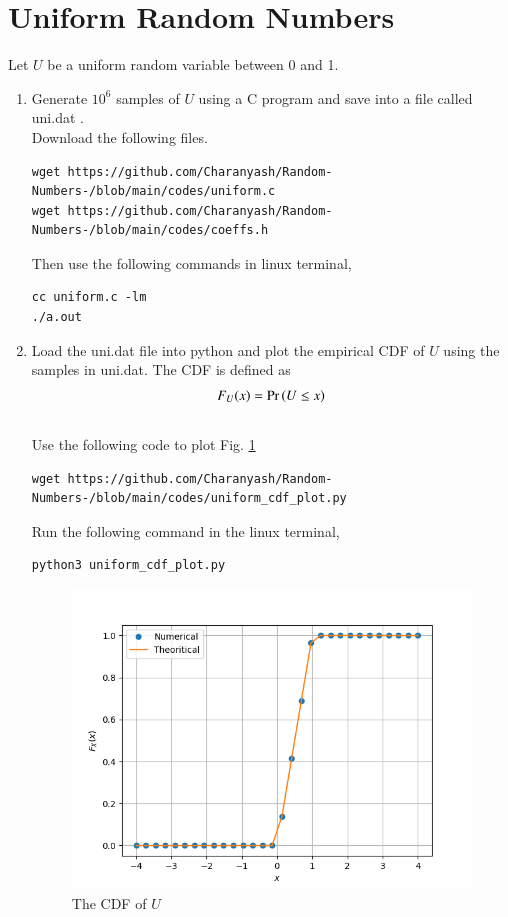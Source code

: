 \documentclass[journal,12pt,twocolumn]{IEEEtran}
\renewcommand\thesection{\arabic{section}}
\begin{document}
\section{Uniform Random Numbers}
Let $U$ be a uniform random variable between 0 and 1.
\begin{enumerate}[label=\thesection.\arabic*,ref=\thesection.\theenumi]
\item Generate $10^6$ samples of $U$ using a C program and save into a file called uni.dat .
\\
\solution Download the following files.
\begin{lstlisting}
wget https://github.com/Charanyash/Random-Numbers-/blob/main/codes/uniform.c 
wget https://github.com/Charanyash/Random-Numbers-/blob/main/codes/coeffs.h
\end{lstlisting}
Then use the following commands in linux terminal,
\begin{lstlisting}
cc uniform.c -lm
./a.out
\end{lstlisting}

%
\item
Load the uni.dat file into python and plot the empirical CDF of $U$ using the samples in uni.dat. The CDF is defined as
\begin{align}
F_{U}(x) = \Pr\left(U \le x\right)
\end{align}
\\
\solution  Use the following code to plot Fig. \ref{fig:uni_cdf}
\begin{lstlisting}
wget https://github.com/Charanyash/Random-Numbers-/blob/main/codes/uniform_cdf_plot.py
\end{lstlisting}
Run the following command in the linux terminal,
\begin{lstlisting}
python3 uniform_cdf_plot.py
\end{lstlisting}

\begin{figure}
\centering
\includegraphics[width=\columnwidth]{figs/uni_cdf.png}
\caption{The CDF of $U$}
\label{fig:uni_cdf}
\end{figure}


\end{enumerate}
\end{document}

